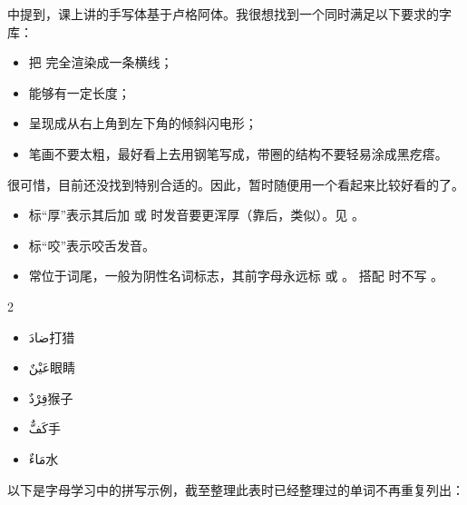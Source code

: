 \begin{note}
     中提到，课上讲的手写体基于卢格阿体。我很想找到一个同时满足以下要求的字库：
    
    \begin{itemize}
        \item 把  完全渲染成一条横线；
        \item {} 能够有一定长度；
        \item {} 呈现成从右上角到左下角的倾斜闪电形；
        \item 笔画不要太粗，最好看上去用钢笔写成，带圈的结构不要轻易涂成黑疙瘩。
    \end{itemize}

    很可惜，目前还没找到特别合适的。因此，暂时随便用一个看起来比较好看的了。
\end{note}

\begin{itemize}
    \item 标``厚''表示其后加  或  时发音要更浑厚（靠后，类似\textipa{[A]}）。见 。
    \item 标``咬''表示咬舌发音。
    \item {} 常位于词尾，一般为阴性名词标志，其前字母永远标  或  。 搭配  时不写 。
\end{itemize}

\begin{multicols}{2}
    \begin{itemize}
        \item \ac{ضادَ}{打猎}
        \item \ac{عَيْنٌ}{眼睛} 
        \item \ac{قِرْدٌ}{猴子}
        \item \ac{كَفٌّ}{手}
        \item \ac{مَاءٌ}{水}
    \end{itemize}
\end{multicols}

以下是字母学习中的拼写示例，截至整理此表时已经整理过的单词不再重复列出：

